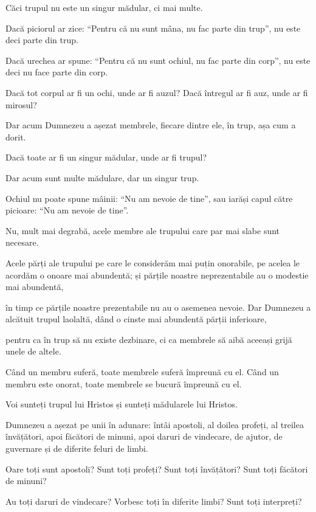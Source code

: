 {\par }{\PP {}Căci trupul nu este un singur mădular, ci mai multe.

Dacă piciorul ar zice: “Pentru că nu sunt mâna, nu fac parte din trup”, nu este deci parte din trup.

Dacă urechea ar spune: “Pentru că nu sunt ochiul, nu fac parte din corp”, nu este deci nu face parte din corp.

Dacă tot corpul ar fi un ochi, unde ar fi auzul? Dacă întregul ar fi auz, unde ar fi mirosul?

Dar acum Dumnezeu a așezat membrele, fiecare dintre ele, în trup, așa cum a dorit.

Dacă toate ar fi un singur mădular, unde ar fi trupul?

Dar acum sunt multe mădulare, dar un singur trup.

Ochiul nu poate spune mâinii: “Nu am nevoie de tine”, sau iarăși capul către picioare: “Nu am nevoie de tine”.

Nu, mult mai degrabă, acele membre ale trupului care par mai slabe sunt necesare.

Acele părți ale trupului pe care le considerăm mai puțin onorabile, pe acelea le acordăm o onoare mai abundentă; și părțile noastre neprezentabile au o modestie mai abundentă,

în timp ce părțile noastre prezentabile nu au o asemenea nevoie. Dar Dumnezeu a alcătuit trupul laolaltă, dând o cinste mai abundentă părții inferioare,

pentru ca în trup să nu existe dezbinare, ci ca membrele să aibă aceeași grijă unele de altele.

Când un membru suferă, toate membrele suferă împreună cu el. Când un membru este onorat, toate membrele se bucură împreună cu el.


\par }{\PP {}Voi sunteți trupul lui Hristos și sunteți mădularele lui Hristos.

Dumnezeu a așezat pe unii în adunare: întâi apostoli, al doilea profeți, al treilea învățători, apoi făcători de minuni, apoi daruri de vindecare, de ajutor, de guvernare și de diferite feluri de limbi.

Oare toți sunt apostoli? Sunt toți profeți? Sunt toți învățători? Sunt toți făcători de minuni?

Au toți daruri de vindecare? Vorbesc toți în diferite limbi? Sunt toți interpreți?

}

